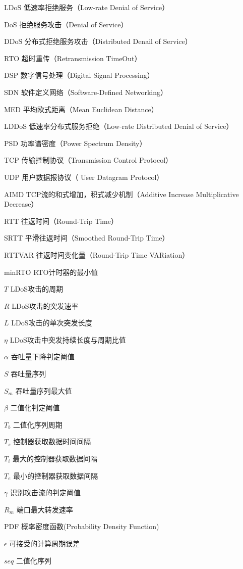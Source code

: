 \begin{denotation}[3cm]
    \item[LDoS] 低速率拒绝服务（Low-rate Denial of Service）
    \item[DoS] 拒绝服务攻击（Denial of Service）
    \item[DDoS] 分布式拒绝服务攻击（Distributed Denail of Service）
    \item[RTO] 超时重传（Retransmission TimeOut）
    \item[DSP] 数字信号处理（Digital Signal Processing）
    \item[SDN] 软件定义网络（Software-Defined Networking）
    \item[MED] 平均欧式距离（Mean Euclidean Distance）
    \item[LDDoS] 低速率分布式服务拒绝（Low-rate Distributed Denial of Service）
    \item[PSD] 功率谱密度（Power Spectrum Density）
    \item[TCP] 传输控制协议（Transmission Control Protocol）
    \item[UDP] 用户数据报协议（ User Datagram Protocol）
    \item[AIMD] TCP流的和式增加，积式减少机制（Additive Increase Multiplicative Decrease）
    \item[RTT]	往返时间（Round-Trip Time）
    \item[SRTT] 平滑往返时间（Smoothed Round-Trip Time）
    \item[RTTVAR] 往返时间变化量（Round-Trip Time VARiation）
    \item[minRTO] RTO计时器的最小值
    \item[$T$] LDoS攻击的周期
    \item[$R$] LDoS攻击的突发速率
    \item[$L$] LDoS攻击的单次突发长度
    \item[$\eta$] LDoS攻击中突发持续长度与周期比值
    \item[$\alpha$] 吞吐量下降判定阈值
    \item[$S$] 吞吐量序列
    \item[$S_m$] 吞吐量序列最大值
    \item[$\beta$] 二值化判定阈值
    \item[$T_b$] 二值化序列周期
    \item[$T_s$] 控制器获取数据时间间隔
    \item[$T_i$] 最大的控制器获取数据间隔
    \item[$T_e$] 最小的控制器获取数据间隔
    \item[$\gamma$] 识别攻击流的判定阈值
    \item[$R_m$] 端口最大转发速率
    \item[PDF] 概率密度函数(Probability Density Function)
    \item[$\epsilon$] 可接受的计算周期误差
    \item[$seq$] 二值化序列

\end{denotation}



